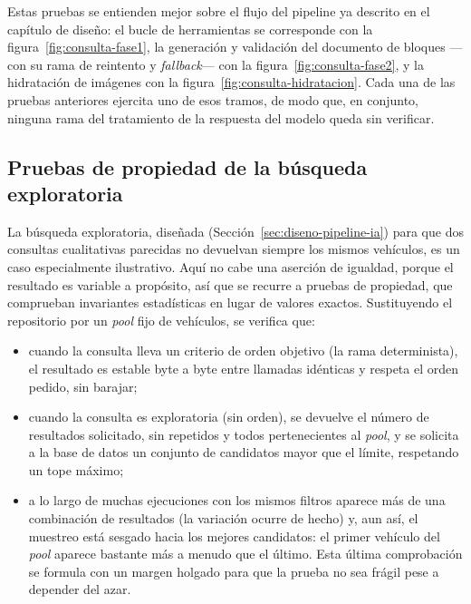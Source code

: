 Estas pruebas se entienden mejor sobre el flujo del pipeline ya descrito en el
capítulo de diseño: el bucle de herramientas se corresponde con la
figura~\ref{fig:consulta-fase1}, la generación y validación del documento
de bloques —con su rama de reintento y \emph{fallback}— con la
figura~\ref{fig:consulta-fase2}, y la hidratación de imágenes con la
figura~\ref{fig:consulta-hidratacion}. Cada una de las pruebas anteriores
ejercita uno de esos tramos, de modo que, en conjunto, ninguna rama del
tratamiento de la respuesta del modelo queda sin verificar.

\subsection{Pruebas de propiedad de la búsqueda exploratoria}
\label{sec:test-variedad}

La búsqueda exploratoria, diseñada (Sección~\ref{sec:diseno-pipeline-ia}) para
que dos consultas cualitativas parecidas no devuelvan siempre los mismos
vehículos, es un caso especialmente ilustrativo. Aquí no cabe una aserción de
igualdad, porque el resultado es variable a propósito, así que se recurre a
pruebas de propiedad, que comprueban invariantes estadísticas en lugar de valores
exactos. Sustituyendo el repositorio por un \emph{pool} fijo de vehículos, se
verifica que:

\begin{itemize}
  \item cuando la consulta lleva un criterio de orden objetivo (la rama
        determinista), el resultado es estable byte a byte entre llamadas
        idénticas y respeta el orden pedido, sin barajar;
  \item cuando la consulta es exploratoria (sin orden), se devuelve el número
        de resultados solicitado, sin repetidos y todos pertenecientes al
        \emph{pool}, y se solicita a la base de datos un conjunto de candidatos
        mayor que el límite, respetando un tope máximo;
  \item a lo largo de muchas ejecuciones con los mismos filtros aparece más de
        una combinación de resultados (la variación ocurre de hecho) y, aun así,
        el muestreo está sesgado hacia los mejores candidatos: el primer vehículo
        del \emph{pool} aparece bastante más a menudo que el último. Esta última
        comprobación se formula con un margen holgado para que la prueba no sea
        frágil pese a depender del azar.
\end{itemize}

